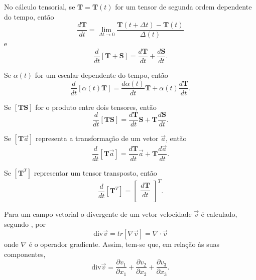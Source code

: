 No cálculo tensorial, se $ \textbf{T} = \textbf{T} (t) $ for um tensor de segunda ordem dependente do tempo, então
\begin{equation}
	\dfrac{d \textbf{T}}{dt} = \lim_{ \Delta t \to 0} \dfrac{ \textbf{T} ( t+ \Delta t) - \textbf{T} (t)}{ \Delta (t)}
\end{equation}
e
\begin{equation}
	\dfrac{d}{dt} [ \textbf{T} + \textbf{S}] = \dfrac{d \textbf{T}}{dt} + \dfrac{d \textbf{S}}{dt}.
\end{equation}

Se $ \alpha(t)$ for um escalar dependente do tempo, então
\begin{equation}
	\dfrac{d}{dt}  [ \alpha(t) \textbf{T}] = \dfrac{d \alpha(t)}{dt} \textbf{T} + \alpha(t) \dfrac{d \textbf{T}}{dt}.
\end{equation}

Se $ [ \textbf{T} \textbf{S}]$ for o produto entre dois tensores, então
\begin{equation}
	\dfrac{d}{dt} [ \textbf{T} \textbf{S}] = \dfrac{d \textbf{T}}{dt} \textbf{S} + \textbf{T} \dfrac{d \textbf{S}}{dt}. 
\end{equation}

Se $ [ \textbf{T} \vec{a}]$ representa a transformação de um vetor $ \vec{a}$, então
\begin{equation}
	\dfrac{d}{dt} [ \textbf{T} \vec{a}] = \dfrac{d \textbf{T}}{dt} \vec{a} + \textbf{T} \dfrac{d \vec{a}}{dt}.
\end{equation}

Se $[ \textbf{T} ^{T}]$ representar um tensor transposto, então
\begin{equation}
	\dfrac{d}{dt} [ \textbf{T} ^{T}] =
	\left[
	\begin{array}{c}
		\dfrac{d \textbf{T}}{dt}\\
	\end{array} \right] ^{T} .
\end{equation}

Para um campo vetorial o divergente de um vetor velocidade $ \vec{v}$ é calculado, segundo , por
\begin{equation}
	\mbox{div} \vec{v} = tr [ { \nabla} \vec{v}] = { \nabla} \cdot \vec{v}
\end{equation} 
onde $ { \nabla} $ é o operador gradiente. Assim, tem-se que, em relação às suas componentes,
\begin{equation}
	\mbox{div} \vec{v} = \dfrac{ \partial v_{1}}{ \partial x_{1}} + \dfrac{ \partial v_{2}}{ \partial x_{2}} +\dfrac{ \partial v_{3}}{ \partial x_{3}}.
\end{equation}

